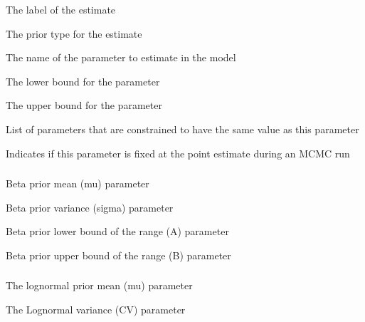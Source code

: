 
 {The label of the estimate}

 {The prior type for the estimate}

 {The name of the parameter to estimate in the model}

 {The lower bound for the parameter}

 {The upper bound for the parameter}

 {List of parameters that are constrained to have the same value as this parameter}

 {Indicates if this parameter is fixed at the point estimate during an MCMC run}

\subsubsection[Beta]{}

 {Beta prior  mean (mu) parameter}

 {Beta prior variance (sigma) parameter}

 {Beta prior lower bound of the range (A) parameter}

 {Beta prior upper bound of the range (B) parameter}

\subsubsection[Lognormal]{}

 {The lognormal prior mean (mu) parameter}

 {The Lognormal variance (CV) parameter}

